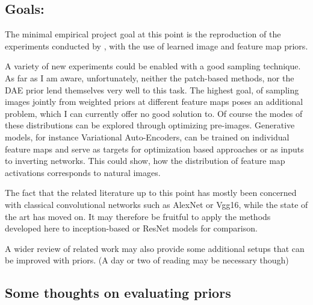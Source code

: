 \documentclass{article}
\begin{document}
\subsection{Goals:}

The minimal empirical project goal at this point is the reproduction of the experiments conducted by \cite{mv16}, with the use of learned image and feature map priors.

A variety of new experiments could be enabled with a good sampling technique. As far as I am aware, unfortunately, neither the patch-based methods, nor the DAE prior lend themselves very well to this task. The highest goal, of sampling images jointly from weighted priors at different feature maps poses an additional problem, which I can currently offer no good solution to. Of course the modes of these distributions can be explored through optimizing pre-images. 
Generative models, for instance Variational Auto-Encoders, can be trained on individual feature maps and serve as targets for optimization based approaches or as inputs to inverting networks. This could show, how the distribution of feature map activations corresponds to natural images.

The fact that the related literature up to this point has mostly been concerned with classical convolutional networks such as AlexNet or Vgg16, while the state of the art has moved on. It may therefore be fruitful to apply the methods developed here to inception-based or ResNet models for comparison.

A wider review of related work may also provide some additional setups that can be improved with priors. (A day or two of reading may be necessary though) 

\subsection{Some thoughts on evaluating priors}
\end{document}
